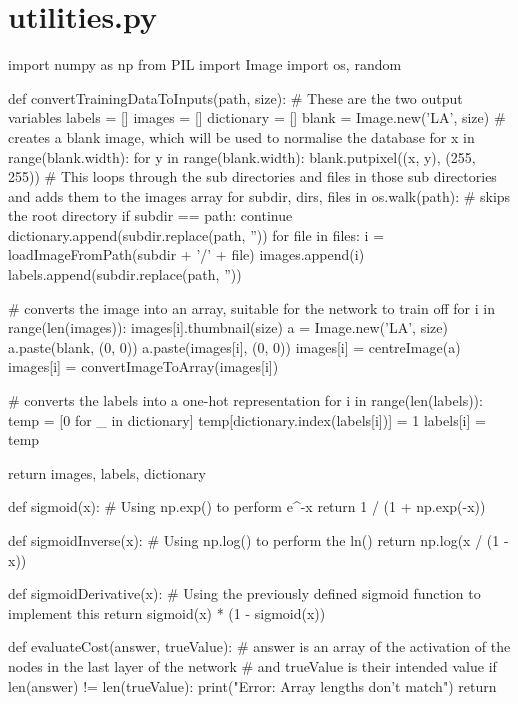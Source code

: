 \documentclass{report}
\begin{document}
\section{utilities.py}
\begin{python}
import numpy as np
from PIL import Image
import os, random


def convertTrainingDataToInputs(path, size):
    # These are the two output variables
    labels = []
    images = []
    dictionary = []
    blank = Image.new('LA', size)  # creates a blank image, which will be used to normalise the database
    for x in range(blank.width):
        for y in range(blank.width):
            blank.putpixel((x, y), (255, 255))
    # This loops through the sub directories and files in those sub directories and adds them to the images array
    for subdir, dirs, files in os.walk(path):
        # skips the root directory
        if subdir == path:
            continue
        dictionary.append(subdir.replace(path, ''))
        for file in files:
            i = loadImageFromPath(subdir + '/' + file)
            images.append(i)
            labels.append(subdir.replace(path, ''))

    # converts the image into an array, suitable for the network to train off
    for i in range(len(images)):
        images[i].thumbnail(size)
        a = Image.new('LA', size)
        a.paste(blank, (0, 0))
        a.paste(images[i], (0, 0))
        images[i] = centreImage(a)
        images[i] = convertImageToArray(images[i])

    # converts the labels into a one-hot representation
    for i in range(len(labels)):
        temp = [0 for _ in dictionary]
        temp[dictionary.index(labels[i])] = 1
        labels[i] = temp

    return images, labels, dictionary


def sigmoid(x):
    # Using np.exp() to perform e^-x
    return 1 / (1 + np.exp(-x))


def sigmoidInverse(x):
    # Using np.log() to perform the ln()
    return np.log(x / (1 - x))


def sigmoidDerivative(x):
    # Using the previously defined sigmoid function to implement this
    return sigmoid(x) * (1 - sigmoid(x))


def evaluateCost(answer, trueValue):
    # answer is an array of the activation of the nodes in the last layer of the network
    # and trueValue is their intended value
    if len(answer) != len(trueValue):
        print("Error: Array lengths don't match")
        return


\end{python}
\end{document}
